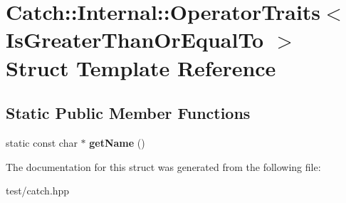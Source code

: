 \hypertarget{structCatch_1_1Internal_1_1OperatorTraits_3_01IsGreaterThanOrEqualTo_01_4}{}\section{Catch\+:\+:Internal\+:\+:Operator\+Traits$<$ Is\+Greater\+Than\+Or\+Equal\+To $>$ Struct Template Reference}
\label{structCatch_1_1Internal_1_1OperatorTraits_3_01IsGreaterThanOrEqualTo_01_4}
\subsection*{Static Public Member Functions}
\begin{DoxyCompactItemize}
\item 
static const char $\ast$ {\bfseries get\+Name} ()\hypertarget{structCatch_1_1Internal_1_1OperatorTraits_3_01IsGreaterThanOrEqualTo_01_4_a76b6f6b0dbaf7d19ebb1b4b4891e719e}{}\label{structCatch_1_1Internal_1_1OperatorTraits_3_01IsGreaterThanOrEqualTo_01_4_a76b6f6b0dbaf7d19ebb1b4b4891e719e}

\end{DoxyCompactItemize}


The documentation for this struct was generated from the following file\+:\begin{DoxyCompactItemize}
\item 
test/catch.\+hpp\end{DoxyCompactItemize}
